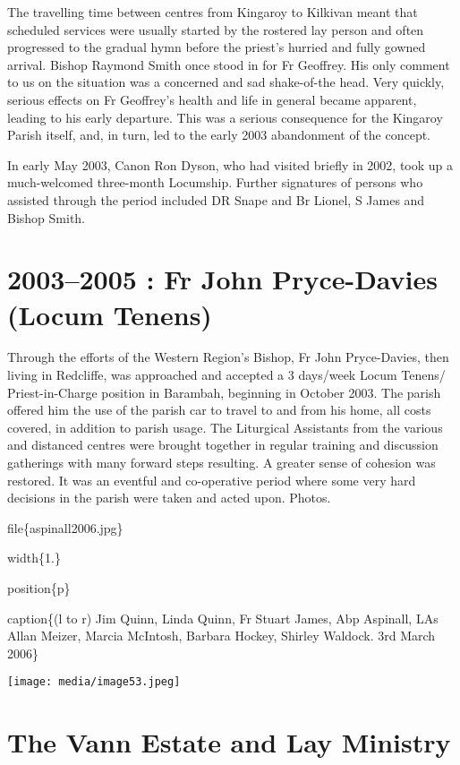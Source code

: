 The travelling time between centres from Kingaroy to Kilkivan meant that scheduled services were usually started by the rostered lay person and often progressed to the gradual hymn before the priest's hurried and fully gowned arrival. Bishop Raymond Smith once stood in for Fr Geoffrey. His only comment to us on the situation was a concerned and sad shake-of-the head. Very quickly, serious effects on Fr Geoffrey's health and life in general became apparent, leading to his early departure. This was a serious consequence for the Kingaroy Parish itself, and, in turn, led to the early 2003 abandonment of the concept.

In early May 2003, Canon Ron Dyson, who had visited briefly in 2002, took up a much-welcomed three-month Locumship. Further signatures of persons who assisted through the period included DR Snape and Br Lionel, S James and Bishop Smith.

\hypertarget{fr-john-pryce-davies-locum-tenens}{%
\section{2003--2005 : Fr John Pryce-Davies (Locum Tenens)}\label{fr-john-pryce-davies-locum-tenens}}

Through the efforts of the Western Region's Bishop, Fr John Pryce-Davies, then living in Redcliffe, was approached and accepted a 3 days/week Locum Tenens/ Priest-in-Charge position in Barambah, beginning in October 2003. The parish offered him the use of the parish car to travel to and from his home, all costs covered, in addition to parish usage. The Liturgical Assistants from the various and distanced centres were brought together in regular training and discussion gatherings with many forward steps resulting. A greater sense of cohesion was restored. It was an eventful and co-operative period where some very hard decisions in the parish were taken and acted upon. Photos.

file\{aspinall2006.jpg\}

width\{1.\}

position\{p\}

caption\{(l to r) Jim Quinn, Linda Quinn, Fr Stuart James, Abp Aspinall, LAs Allan Meizer, Marcia McIntosh, Barbara Hockey, Shirley Waldock. 3rd March 2006\}

\texttt{[image: media/image53.jpeg]}

\hypertarget{the-vann-estate-and-lay-ministry}{%
\section{The Vann Estate and Lay Ministry}\label{the-vann-estate-and-lay-ministry}}

